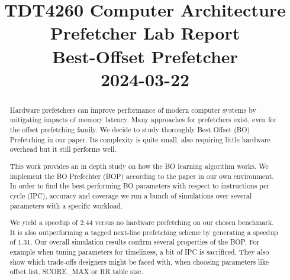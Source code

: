 \documentclass[conference]{IEEEtran}
\begin{document}
\title{TDT4260 Computer Architecture\\
Prefetcher Lab Report\\
Best-Offset Prefetcher\\
{\footnotesize 2024-03-22}
}

\author{
\and
{}
}

\maketitle

\begin{abstract}
Hardware prefetchers can improve performance of modern computer systems by mitigating impacts of memory latency.
Many approaches for prefetchers exist, even for the offset prefetching family.
We decide to study thoroughly Best Offset (BO) Prefetching \cite{BOP_2016} in our paper.
Its complexity is quite small, also requiring little hardware overhead but it still performs well.

This work provides an in depth study on how the BO learning algorithm works.
We implement the BO Prefechter (BOP) according to the paper in our own environment.
In order to find the best performing BO parameters with respect to
instructions per cycle (IPC), accuracy and coverage
we run a bunch of simulations over several parameters with a specific workload.

We yield a speedup of 2.44 versus no hardware prefetching on our chosen benchmark.
It is also outperforming a tagged next-line prefetching scheme\cite{wiel_lilja_2000_data_prefetch_mechanisms} by generating a speedup of 1.31.
Our overall simulation results confirm several properties of the BOP.
For example when tuning parameters for timeliness, a bit of IPC is sacrificed.
They also show which trade-offs designers might be faced with, when choosing parameters like offset list, SCORE\_MAX or RR table size.
\end{abstract}

\end{document}
